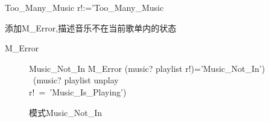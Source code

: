 \documentclass[14pt]{article}
\numberwithin{figure}{subsection}
\begin{document}
\begin{minipage}[t]{0.5\linewidth}
\begin{flushleft}
\begin{schema}{Too\_Many\_Music}
            r!:='Too\_Many\_Music
        \end{schema}
        添加M\_Error,描述音乐不在当前歌单内的状态
        \begin{syntax}
            M\_Error
        \end{syntax}
        \vspace{-1.5cm}
        \begin{figure}[H]
            \setlength{\abovecaptionskip}{0.cm}
            \setlength{\belowcaptionskip}{0.cm}
            \begin{schema}{Music\_Not\_In}
                M\_Error
                \where
                (music? \not\in playlist \wedge r!)='Music\_Not\_In')\\
                \vee \ (music? \in playlist \setminus unplay \wedge\\
                r!\ =\ 'Music\_Is\_Playing')
            \end{schema}
            \caption{模式Music\_Not\_In}
        \end{figure}
    \end{flushleft}
\end{minipage}
\hfill
\end{document}
